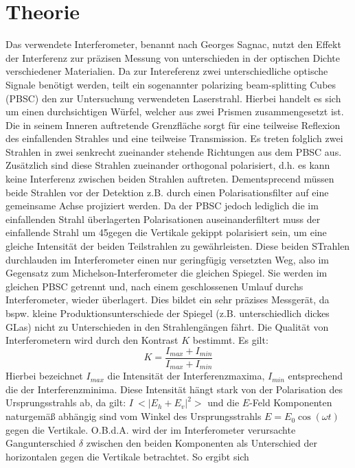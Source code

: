   \section{Theorie}
  Das verwendete Interferometer, benannt nach Georges Sagnac, nutzt den Effekt der Interferenz zur präzisen Messung von unterschieden in der optischen Dichte verschiedener Materialien. Da zur Intereferenz zwei unterschiedliche optische Signale benötigt werden, teilt ein sogenannter polarizing beam-splitting Cubes (PBSC) den zur Untersuchung verwendeten Laserstrahl. Hierbei handelt es sich um einen durchsichtigen Würfel, welcher aus zwei Prismen zusammengesetzt ist. Die in seinem Inneren auftretende Grenzfläche sorgt für eine teilweise Reflexion des einfallenden Strahles und eine teilweise Transmission. Es treten folglich zwei Strahlen in zwei senkrecht zueinander stehende Richtungen aus dem PBSC aus. Zusätzlich sind diese Strahlen zueinander orthogonal polarisiert, d.h. es kann keine Interferenz zwischen beiden Strahlen auftreten. Dementsprecend müssen beide Strahlen vor der Detektion z.B. durch einen Polarisationsfilter auf eine gemeinsame Achse projiziert werden. Da der PBSC jedoch lediglich die im einfallenden Strahl überlagerten Polarisationen auseinanderfiltert muss der einfallende Strahl um 45\circ gegen die Vertikale gekippt polarisiert sein, um eine gleiche Intensität der beiden Teilstrahlen zu gewährleisten. Diese beiden STrahlen durchlauden im Interferometer einen nur geringfügig versetzten Weg, also im Gegensatz zum Michelson-Interferometer die gleichen Spiegel. Sie werden im gleichen PBSC getrennt und, nach einem geschlossenen Umlauf durchs Interferometer, wieder überlagert. Dies bildet ein sehr präzises Messgerät, da bspw. kleine Produktionsunterschiede der Spiegel (z.B. unterschiedlich dickes GLas) nicht zu Unterschieden in den Strahlengängen fährt. Die Qualität von Interferometern wird durch den Kontrast $K$ bestimmt. Es gilt:
  \begin{equation}
  	\label{eq:kontrast}
	K = \frac{I_{max}+I_{min}}{I_{max}+I_{min}}
  \end{equation}
Hierbei bezeichnet $I_{max}$ die Intensität der Interferenzmaxima, $I_{min}$ entsprechend die der Interferenzminima. Diese Intensität hängt stark von der Polarisation des Ursprungsstrahls ab, da gilt: $I~<|E_h+E_v|^2>$ und die $E$-Feld Komponenten naturgemäß abhängig sind vom Winkel des Ursprungsstrahls $E = E_0 \cos (\omega t)$ gegen die Vertikale. O.B.d.A. wird der im Interferometer verursachte Gangunterschied $\delta$ zwischen den beiden Komponenten als Unterschied der horizontalen gegen die Vertikale betrachtet. So ergibt sich
